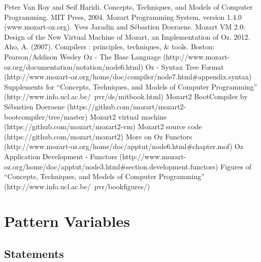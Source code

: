 \documentclass[a4paper]{memoir}
\begin{document}
\begin{appendices} 


\begin{thebibliography}{1}
    Peter Van Roy and Seif Haridi.  Concepts, Techniques, and Models of Computer Programming. MIT Press, 2004.
   Mozart Programming System, version 1.4.0 (www.mozart-oz.org).
   Yves Jaradin and Sébastien Doeraene. Mozart VM 2.0: Design of the New Virtual Machine of Mozart, an Implementation of Oz. 2012.
   Aho, A. (2007). Compilers : principles, techniques, \& tools. Boston: Pearson/Addison Wesley
   Oz - The Base Language (http://www.mozart-oz.org/documentation/notation/node6.html)
   Oz - Syntax Tree Format (http://www.mozart-oz.org/home/doc/compiler/node7.html\#appendix.syntax)
   Supplements for ``Concepts, Techniques, and Models of Computer Programming'' (http://www.info.ucl.ac.be/~pvr/ds/mitbook.html)
   Mozart2 BootCompiler by S\'{e}bastien Doeraene (https://github.com/mozart/mozart2-bootcompiler/tree/master)
   Mozart2 virtual machine (https://github.com/mozart/mozart2-vm)
   Mozart2 source code (https://github.com/mozart/mozart2)
   More on Oz Functors (http://www.mozart-oz.org/home/doc/apptut/node6.html\#chapter.mof)
   Oz Application Development - Functors (http://www.mozart-oz.org/home/doc/apptut/node3.html\#section.development.functors)
   Figures of ``Concepts, Techniques, and Models of Computer Programming'' (http://www.info.ucl.ac.be/~pvr/bookfigures/)
\end{thebibliography}


\chapter{Pattern Variables}\label{appendix:patternvariables}
\section{Statements}


\end{appendices}
\end{document}
